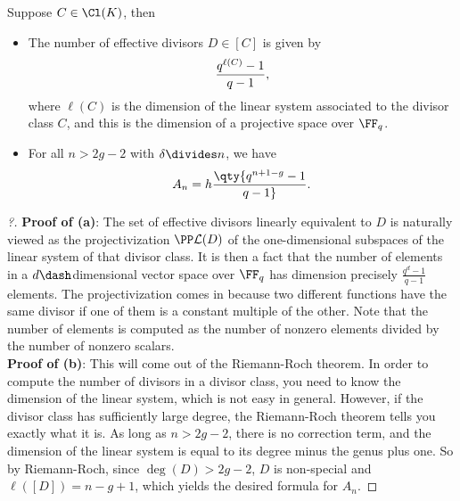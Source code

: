 \begin{lemma}[?]

Suppose \(C\in \Cl(K)\), then

\begin{itemize}
\item
  The number of effective divisors \(D \in [C]\) is given by
  \begin{align*}  
  {q^{\ell(C)} -1 \over q-1} 
  ,\end{align*} where \(\ell(C)\) is the dimension of the linear system
  associated to the divisor class \(C\), and this is the dimension of a
  projective space over \(\FF_q\).
\item
  For all \(n>2g-2\) with \(\delta \divides n\), we have
  \begin{align*}  
  A_n = h \qty{ q^{n+1-g} - 1\over q-1}
  .\end{align*}
\end{itemize}

\end{lemma}

\begin{proof}[?]

\envlist

\textbf{Proof of (a)}: The set of effective divisors linearly equivalent
to \(D\) is naturally viewed as the projectivization
\(\PP \mathcal{L}(D)\) of the one-dimensional subspaces of the linear
system of that divisor class. It is then a fact that the number of
elements in a \(d\dash\)dimensional vector space over \(\FF_q\) has
dimension precisely \(\frac{q^d-1}{q-1}\) elements. The projectivization
comes in because two different functions have the same divisor if one of
them is a constant multiple of the other. Note that the number of
elements is computed as the number of nonzero elements divided by the
number of nonzero scalars.\\

\textbf{Proof of (b)}: This will come out of the Riemann-Roch theorem.
In order to compute the number of divisors in a divisor class, you need
to know the dimension of the linear system, which is not easy in
general. However, if the divisor class has sufficiently large degree,
the Riemann-Roch theorem tells you exactly what it is. As long as
\(n > 2g-2\), there is no correction term, and the dimension of the
linear system is equal to its degree minus the genus plus one. So by
Riemann-Roch, since \(\deg(D) > 2g-2\), \(D\) is non-special and
\(\ell([D]) = n-g+1\), which yields the desired formula for \(A_n\).

\end{proof}

